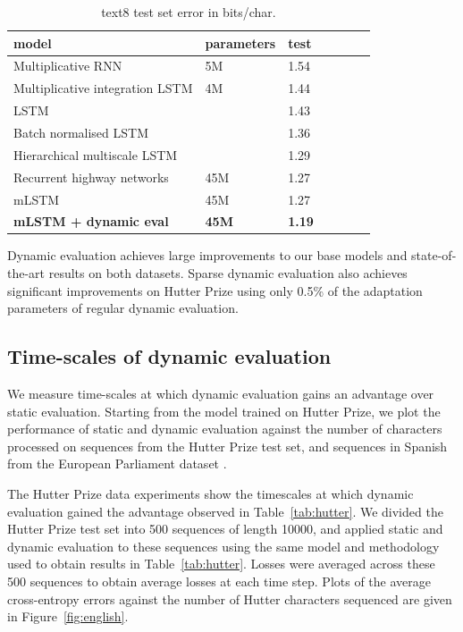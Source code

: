 \documentclass{article} %
\begin{document}
\begin{table}[tb]
\begin{center} 
\begin{tabular}{  l  l  l  l  l  l  l } \toprule 
model & parameters & test  \\ 
\midrule 
Multiplicative RNN \citep{mikolov2012subword}& 5M & 1.54 \\
Multiplicative integration LSTM \citep{wu2016}& 4M & 1.44 \\
LSTM \citep{cooijmans2017}& & 1.43 \\
Batch normalised LSTM \citep{cooijmans2017}& & 1.36 \\
Hierarchical multiscale LSTM \citep{chung2017}&  & 1.29 \\
Recurrent highway networks \citep{zilly2017}& 45M & 1.27 \\
\midrule 
mLSTM \citep{krause2016} &45M& 1.27 \\
\textbf{mLSTM + dynamic eval} &\textbf{45M} & \textbf{1.19} \\
\bottomrule
\end{tabular} 
\end{center}
\caption{text8 test set error in bits/char.}
\label{tab:text8}
\end{table}
Dynamic evaluation achieves large improvements to our base models and state-of-the-art results on both datasets. Sparse dynamic evaluation also achieves significant improvements on Hutter Prize using only 0.5\% of the adaptation parameters of regular dynamic evaluation.

\subsection{Time-scales of dynamic evaluation}
\label{sec:timescales}
We measure time-scales at which dynamic evaluation gains an advantage over static evaluation. Starting from the model trained on Hutter Prize, we plot the performance of static and dynamic evaluation against the number of characters processed on sequences from the Hutter Prize test set, and sequences in Spanish from the European Parliament dataset \citep{koehn2005}.


The Hutter Prize data experiments show the timescales at which dynamic evaluation gained the advantage observed in Table~\ref{tab:hutter}. We divided the Hutter Prize test set into 500 sequences of length 10000, and applied static and dynamic evaluation to these sequences using the same model and methodology used to obtain results in Table~\ref{tab:hutter}. Losses were averaged across these 500 sequences to obtain average losses at each time step. Plots of the average cross-entropy errors against the number of Hutter characters sequenced are given in Figure~\ref{fig:english}.
\end{document}
